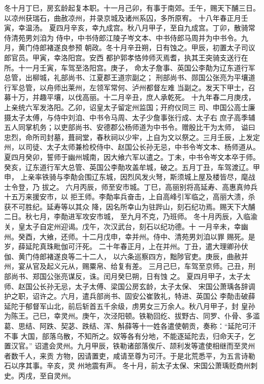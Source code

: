 \documentclass[12pt,UTF8]{ctexbook}
\begin{document}
冬十月丁巳，房玄龄起复本职。十一月己卯，有事于南郊。壬午，赐天下酺三日。
以凉州获瑞石，曲赦凉州，并录京城及诸州系囚，多所原宥。
十八年春正月壬寅，幸温汤。
夏四月辛亥，幸九成宫。秋八月甲子，至自九成宫。丁卯，散骑常侍清苑男刘洎为
侍中，中书侍郎江陵子岑文本、中书侍郎马周并为中书令。九月，黄门侍郎褚遂良参预
朝政。冬十月辛丑朔，日有蚀之。甲辰，初置太子司议郎官员。甲寅，幸洛阳宫。安西
都护郭孝恪帅师灭焉耆，执其王突骑支送行在所。十一月壬寅，车驾至洛阳宫。庚子，
命太子詹事、英国公李勣为辽东道行军总管，出柳城，礼部尚书、江夏郡王道宗副之；
刑部尚书、郧国公张亮为平壤道行军总管，以舟师出莱州，左领军常何、泸州都督左难
当副之。发天下甲士，召募十万，并趣平壤，以伐高丽。十二月辛丑，庶人承乾死。
十九年春二月庚戌，上亲统六军发洛阳。乙卯，诏皇太子留定州监国；开府仪同三
司、申国公高士廉摄太子太傅，与侍中刘洎、中书令马周、太子少詹事张行成、太子右
庶子高季辅五人同掌机务；以吏部尚书、安德郡公杨师道为中书令。赠殷比干为太师，
谥曰忠烈，命所司封墓，葺祠堂，春秋祠以少牢，上自为文以祭之。三月壬辰，上发定
州，以司徒、太子太师兼检校侍中、赵国公长孙无忌，中书令岑文本、杨师道从。
夏四月癸卯，誓师于幽州城南，因大飨六军以遣之。丁未，中书令岑文本卒于师。
癸亥，辽东道行军大总管、英国公李勣攻盖牟城，破之。五月丁丑，车驾渡辽。甲申，
上亲率铁骑与李勣会围辽东城，因烈风发火弩，斯须城上屋及楼皆尽，麾战士令登，乃
拔之。
六月丙辰，师至安市城。丁巳，高丽别将高延寿、高惠真帅兵十五万来援安市，以
拒王师。李勣率兵奋击，上自高峰引军临之，高丽大溃，杀获不可胜纪。延寿等以其众
降，因名所幸山为驻跸山，刻石纪功焉。赐天下大酺二日。秋七月，李勣进军攻安市城，
至九月不克，乃班师。
冬十月丙辰，入临渝关，皇太子自定州迎谒。戊午，次汉武台，刻石以纪功德。十
一月辛未，幸幽州。癸酉，大飨，还师。十二月戊申，幸并州。侍中、清苑男刘洎以罪
赐死。是岁，薛延陀真珠毗伽可汗死。
二十年春正月，上在并州。丁丑，遣大理卿孙伏伽、黄门侍郎褚遂良等二十二人，
以六条巡察四方，黜陟官吏。庚辰，曲赦并州，宴从官及起义元从，赐粟帛、给复有差。
三月己巳，车驾至京师。己丑，刑部尚书、郑国公张亮谋反，诛。闰月癸巳朔，日有蚀
之。
夏四月甲子，太子太师、赵国公长孙无忌，太子太傅、梁国公房玄龄，太子太保、
宋国公萧瑀各辞调护之职，诏许之。六月，遣兵部尚书、固安公崔敦礼，特进、英国公
李勣击破薛延陀于郁督军山北，前后斩首五千余级，虏男女三万余人。秋八月甲子，封
皇孙为陈王。己巳，幸灵州。庚午，次泾阳顿。铁勒回纥、拔野古、同罗、仆骨、多滥
葛、思结、阿跌、契苾、跌结、浑、斛薛等十一姓各遣使朝贡，奏称：“延陀可汗不事
大国，部落乌散，不知所之。奴等各有分地，不能逐延陀去，归命天子，乞置汉官。”
诏遣会灵州。九月甲辰，铁勒诸部落俟斤、颉利发等遣使相继而至灵州者数千人，来贡
方物，因请置吏，咸请至尊为可汗。于是北荒悉平，为五言诗勒石以序其事。辛亥，灵
州地震有声。
冬十月，前太子太保、宋国公萧瑀贬商州刺史。丙戌，至自灵州。
\end{document}
